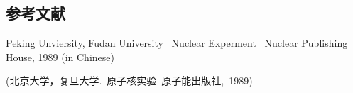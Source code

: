 \documentclass[a4paper,10.0pt,twoside]{npr}
\begin{document}
\begin{multicols}{2}
\section{参考文献}

\noindent
[1] Peking Unviersity, Fudan University \ Nuclear Experment
\ Nuclear Publishing House, 1989 (in Chinese)

\noindent
 (北京大学，复旦大学.\ 原子核实验\ 原子能出版社,\ 1989)

\end{multicols}

\newpage

\clearpage
\end{document}

